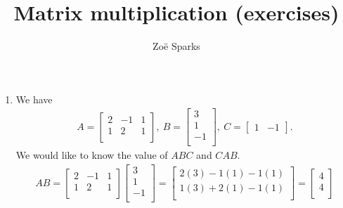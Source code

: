 \documentclass[12pt]{article}
\title{Matrix multiplication (exercises)}
\author{Zoë Sparks}
\begin{document}
\theoremstyle{definition}

\newtheorem{thm}{Theorem}
\newtheorem*{nthm}{Theorem}
\newtheorem{sthm}{}[thm]
\newtheorem{lemma}{Lemma}[thm]
\newtheorem{cor}{Corollary}[thm]
\newtheorem*{prop}{Property}
\newtheorem*{defn}{Definition}
\newtheorem*{comm}{Comment}
\newtheorem*{exm}{Example}

\maketitle

\begin{enumerate}
  \item
    We have
    \begin{align*}
      A =
      \begin{bmatrix}
        2 & -1 & 1\\
        1 &  2 & 1\\
      \end{bmatrix},\
      B =
      \begin{bmatrix}
         3\\
         1\\
        -1\\
      \end{bmatrix},\
      C =
      \begin{bmatrix}
        1 & -1
      \end{bmatrix}.
    \end{align*}
    We would like to know the value of $ABC$ and $CAB$.
    \begin{align*}
      AB =
      \begin{bmatrix}
        2 & -1 & 1\\
        1 &  2 & 1\\
      \end{bmatrix}
      \begin{bmatrix}
         3\\
         1\\
        -1\\
      \end{bmatrix}
      =
      \begin{bmatrix}
        2(3) - 1(1) - 1(1)\\
        1(3) + 2(1) - 1(1)\\
      \end{bmatrix}
      =
      \begin{bmatrix}
        4\\
        4\\

\end{bmatrix}
\end{align*}
\end{enumerate}
\end{document}
